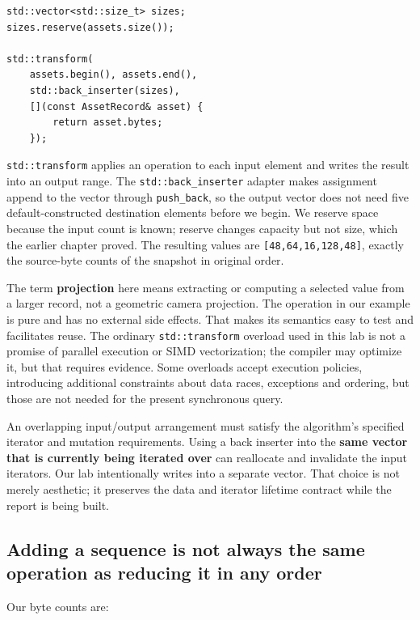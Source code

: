 \begin{verbatim}
std::vector<std::size_t> sizes;
sizes.reserve(assets.size());

std::transform(
    assets.begin(), assets.end(),
    std::back_inserter(sizes),
    [](const AssetRecord& asset) {
        return asset.bytes;
    });
\end{verbatim}

\texttt{std::transform} applies an operation to each input element and writes the result into an output range. The \texttt{std::back\_inserter} adapter makes assignment append to the vector through \texttt{push\_back}, so the output vector does not need five default-constructed destination elements before we begin. We reserve space because the input count is known; reserve changes capacity but not size, which the earlier chapter proved. The resulting values are \texttt{{[}48,64,16,128,48{]}}, exactly the source-byte counts of the snapshot in original order.

The term \textbf{projection} here means extracting or computing a selected value from a larger record, not a geometric camera projection. The operation in our example is pure and has no external side effects. That makes its semantics easy to test and facilitates reuse. The ordinary \texttt{std::transform} overload used in this lab is not a promise of parallel execution or SIMD vectorization; the compiler may optimize it, but that requires evidence. Some overloads accept execution policies, introducing additional constraints about data races, exceptions and ordering, but those are not needed for the present synchronous query.

An overlapping input/output arrangement must satisfy the algorithm's specified iterator and mutation requirements. Using a back inserter into the \textbf{same vector that is currently being iterated over} can reallocate and invalidate the input iterators. Our lab intentionally writes into a separate vector. That choice is not merely aesthetic; it preserves the data and iterator lifetime contract while the report is being built.

\subsection{Adding a sequence is not always the same operation as reducing it in any order}\label{01-foundations-i-ch006-adding-a-sequence-is-not-always-the-same-operation-as-reducing-it-in-any-order}

Our byte counts are:

